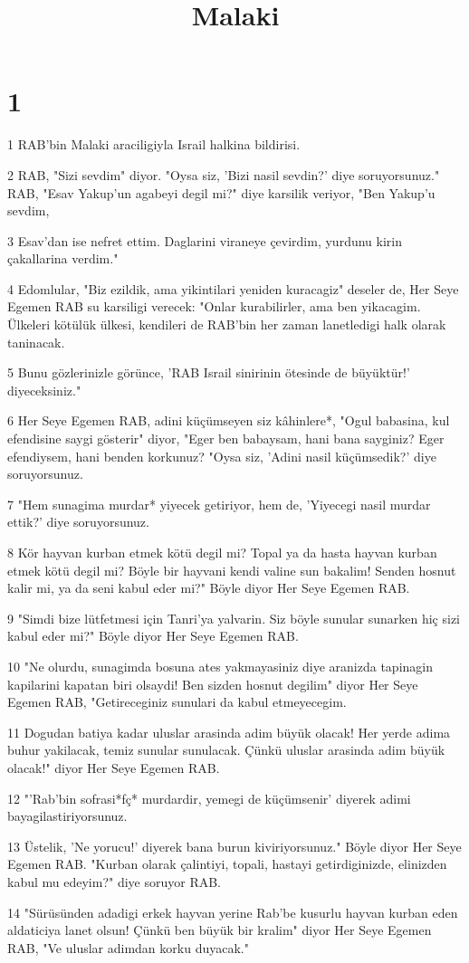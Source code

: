 

\title{Malaki}


\chapter{1}

\par 1 RAB'bin Malaki araciligiyla Israil halkina bildirisi.
\par 2 RAB, "Sizi sevdim" diyor. "Oysa siz, 'Bizi nasil sevdin?' diye soruyorsunuz." RAB, "Esav Yakup'un agabeyi degil mi?" diye karsilik veriyor, "Ben Yakup'u sevdim,
\par 3 Esav'dan ise nefret ettim. Daglarini viraneye çevirdim, yurdunu kirin çakallarina verdim."
\par 4 Edomlular, "Biz ezildik, ama yikintilari yeniden kuracagiz" deseler de, Her Seye Egemen RAB su karsiligi verecek: "Onlar kurabilirler, ama ben yikacagim. Ülkeleri kötülük ülkesi, kendileri de RAB'bin her zaman lanetledigi halk olarak taninacak.
\par 5 Bunu gözlerinizle görünce, 'RAB Israil sinirinin ötesinde de büyüktür!' diyeceksiniz."
\par 6 Her Seye Egemen RAB, adini küçümseyen siz kâhinlere*, "Ogul babasina, kul efendisine saygi gösterir" diyor, "Eger ben babaysam, hani bana sayginiz? Eger efendiysem, hani benden korkunuz? "Oysa siz, 'Adini nasil küçümsedik?' diye soruyorsunuz.
\par 7 "Hem sunagima murdar* yiyecek getiriyor, hem de, 'Yiyecegi nasil murdar ettik?' diye soruyorsunuz.
\par 8 Kör hayvan kurban etmek kötü degil mi? Topal ya da hasta hayvan kurban etmek kötü degil mi? Böyle bir hayvani kendi valine sun bakalim! Senden hosnut kalir mi, ya da seni kabul eder mi?" Böyle diyor Her Seye Egemen RAB.
\par 9 "Simdi bize lütfetmesi için Tanri'ya yalvarin. Siz böyle sunular sunarken hiç sizi kabul eder mi?" Böyle diyor Her Seye Egemen RAB.
\par 10 "Ne olurdu, sunagimda bosuna ates yakmayasiniz diye aranizda tapinagin kapilarini kapatan biri olsaydi! Ben sizden hosnut degilim" diyor Her Seye Egemen RAB, "Getireceginiz sunulari da kabul etmeyecegim.
\par 11 Dogudan batiya kadar uluslar arasinda adim büyük olacak! Her yerde adima buhur yakilacak, temiz sunular sunulacak. Çünkü uluslar arasinda adim büyük olacak!" diyor Her Seye Egemen RAB.
\par 12 "'Rab'bin sofrasi*fç* murdardir, yemegi de küçümsenir' diyerek adimi bayagilastiriyorsunuz.
\par 13 Üstelik, 'Ne yorucu!' diyerek bana burun kiviriyorsunuz." Böyle diyor Her Seye Egemen RAB. "Kurban olarak çalintiyi, topali, hastayi getirdiginizde, elinizden kabul mu edeyim?" diye soruyor RAB.
\par 14 "Sürüsünden adadigi erkek hayvan yerine Rab'be kusurlu hayvan kurban eden aldaticiya lanet olsun! Çünkü ben büyük bir kralim" diyor Her Seye Egemen RAB, "Ve uluslar adimdan korku duyacak."

